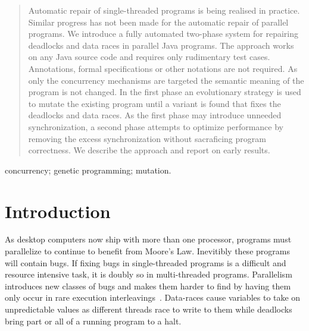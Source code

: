 \documentclass[10pt, conference, compsocconf]{IEEEtran}
\begin{document}
\begin{abstract}

Automatic repair of single-threaded programs is being realised in practice.
Similar progress has not been made for the automatic repair of parallel
programs.  We introduce a fully automated two-phase system for repairing
deadlocks and data races in parallel Java programs. The approach works on any
Java source code and requires only rudimentary test cases. Annotations, formal
specifications or other notations are not required. As only the concurrency
mechanisms are targeted the semantic meaning of the program is not changed. In
the first phase an evolutionary strategy is used to mutate the existing program
until a variant is found that fixes the deadlocks and data races. As the first
phase may introduce unneeded synchronization, a second phase attempts to
optimize performance by removing the excess synchronization without sacraficing
program correctness. We describe the approach and report on early results.

\end{abstract}

\begin{IEEEkeywords}
concurrency; genetic programming; mutation.

\end{IEEEkeywords}


%
\IEEEpeerreviewmaketitle



\section{Introduction}
\label{sec:introduction}

As desktop computers now ship with more than one processor, programs must
parallelize to continue to benefit from Moore's Law. Inevitibly these
programs will contain bugs. If fixing bugs in single-threaded programs is
a difficult and resource intensive task,  it is doubly so in multi-threaded
programs. Parallelism~\cite{SL05} introduces new classes of bugs and makes
them harder to find by having them only occur in rare execution
interleavings~\cite{MQB07}. Data-races cause variables to take on
unpredictable values as different threads race to write to them while
deadlocks bring part or all of a running program to a halt.
\end{document}
